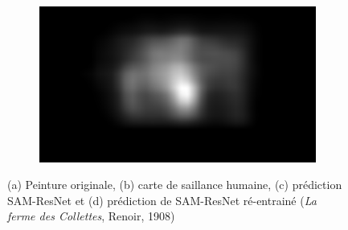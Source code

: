 \begin{figure}[ht]
\begin{subfigure}{.24\textwidth}
        \caption{}
    \end{subfigure}
    \begin{subfigure}{.24\textwidth}
        \includegraphics[width=\linewidth]{datas/samresnet/retrain_La_Ferme_des_Collettes_Renoir_1908.png}
        \caption{}
    \end{subfigure}
    \caption{(a) Peinture originale, (b) carte de saillance humaine, (c) prédiction SAM-ResNet et (d) prédiction de SAM-ResNet ré-entrainé (\emph{La ferme des Collettes}, Renoir, 1908)}
    \label{fig:avantapres}
\end{figure}

